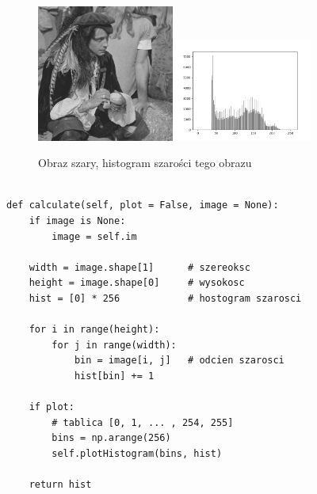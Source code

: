 \documentclass[final,a4paper,openany,12pt]{mwbk}
\begin{document}
\begin{figure}[H]
	\begin{center}
		\includegraphics[width=0.4\textwidth]{pirate_gray}
		\includegraphics[width=0.4\textwidth]{pirate_gray_histogram}
	\end{center}
	\caption{Obraz szary, histogram szarości tego obrazu}
\end{figure}
\newpage


\begin{lstlisting}[caption=Obliczanie histogramu]
	
def calculate(self, plot = False, image = None):
	if image is None:
		image = self.im
	
	width = image.shape[1]      # szereoksc
	height = image.shape[0]     # wysokosc
	hist = [0] * 256            # hostogram szarosci
	
	for i in range(height):
		for j in range(width):
			bin = image[i, j]   # odcien szarosci
			hist[bin] += 1
	
	if plot:
		# tablica [0, 1, ... , 254, 255]
		bins = np.arange(256)
		self.plotHistogram(bins, hist)
	
	return hist
	
\end{lstlisting}

\newpage
\end{document}
